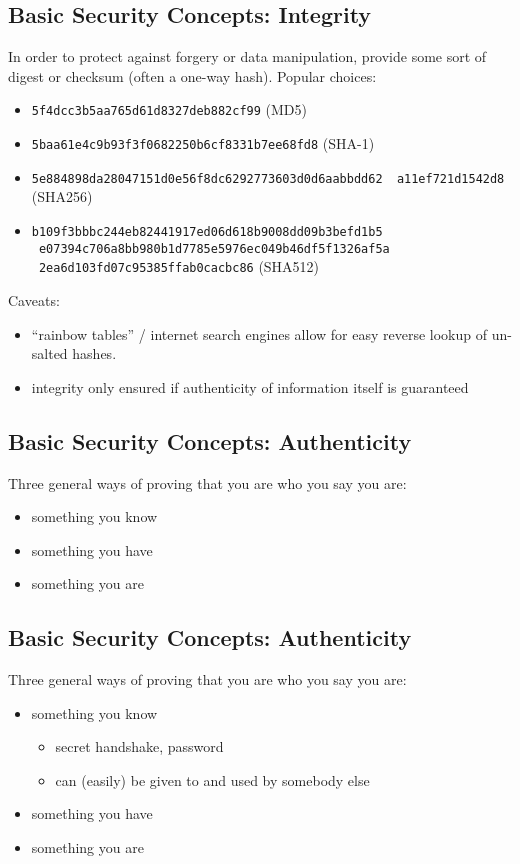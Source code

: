 \documentclass[xga]{xdvislides}
\begin{document}
\subsection{Basic Security Concepts: Integrity}
In order to protect against forgery or data manipulation, provide some sort of
digest or checksum (often a one-way hash).  Popular choices:

\begin{itemize}
	\item {\tt 5f4dcc3b5aa765d61d8327deb882cf99} (MD5)
	\item {\tt 5baa61e4c9b93f3f0682250b6cf8331b7ee68fd8} (SHA-1)
	\item {\tt 5e884898da28047151d0e56f8dc6292773603d0d6aabbdd62 \
                   a11ef721d1542d8} (SHA256)
	\item {\tt b109f3bbbc244eb82441917ed06d618b9008dd09b3befd1b5 \
                   e07394c706a8bb980b1d7785e5976ec049b46df5f1326af5a \
                   2ea6d103fd07c95385ffab0cacbc86} (SHA512)
\end{itemize}


Caveats:
\begin{itemize}
	\item ``rainbow tables'' / internet search engines allow for easy reverse
		lookup of un-salted hashes.
	\item integrity only ensured if authenticity of information itself is
		guaranteed
\end{itemize}

\subsection{Basic Security Concepts: Authenticity}
Three general ways of proving that you are who you say you are:
\begin{itemize}
	\item something you know
	\item something you have
	\item something you are
\end{itemize}

\subsection{Basic Security Concepts: Authenticity}
Three general ways of proving that you are who you say you are:
\begin{itemize}
	\item something you know
		\begin{itemize}
			\item secret handshake, password
			\item can (easily) be given to and used by somebody else
		\end{itemize}
	\item something you have
	\item something you are
\end{itemize}
\end{document}
